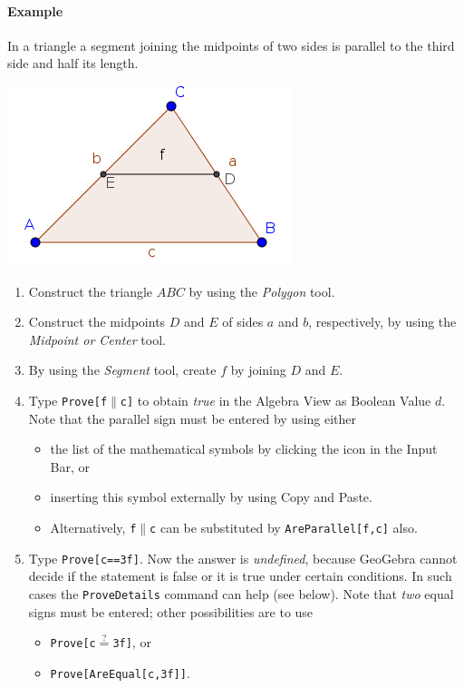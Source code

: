 \documentclass{article}
\begin{document}

\paragraph{Example}
In a triangle a segment joining the midpoints of two sides
is parallel to the third side and half its length.
\begin{center}
\includegraphics[scale=0.5]{Prove-example}
\end{center}
\begin{enumerate}
\item Construct the triangle $ABC$ by using the \textit{Polygon} tool.
\item Construct the midpoints $D$ and $E$ of sides $a$ and $b$, respectively, by using the \textit{Midpoint or Center} tool.
\item By using the \textit{Segment} tool, create $f$ by joining $D$ and $E$.
\item Type \texttt{Prove[f$\parallel$c]} to obtain \textit{true} in the Algebra View as Boolean Value $d$. Note that the parallel sign must be entered by using either
\begin{itemize}
\item the list of the mathematical symbols by clicking the \framebox{$\alpha$} icon in the Input Bar, or
\item inserting this symbol externally by using Copy and Paste.
\item Alternatively, \texttt{f$\parallel$c} can be substituted by \texttt{AreParallel[f,c]} also.
\end{itemize}

\item Type \texttt{Prove[c==3f]}. Now the answer is \textit{undefined}, because GeoGebra cannot decide if the statement is false or it is true under certain conditions. In such cases the \texttt{ProveDetails} command can help (see below). Note that \textit{two} equal signs must be entered; other possibilities are to use
\begin{itemize}
    \item \texttt{Prove[c$\stackrel{?}{=}$3f]}, or
    \item \texttt{Prove[AreEqual[c,3f]]}.
\end{itemize}

\end{enumerate}
\end{document}

